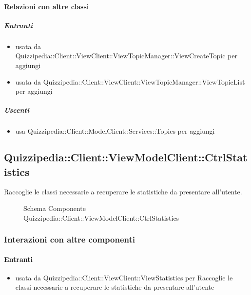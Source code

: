 \paragraph{Relazioni con altre classi}
\subparagraph{Entranti}
\begin{itemize}
\item usata da Quizzipedia::Client::ViewClient::ViewTopicManager::ViewCreateTopic per aggiungi
\item usata da Quizzipedia::Client::ViewClient::ViewTopicManager::ViewTopicList per aggiungi
\end{itemize}
\subparagraph{Uscenti}
\begin{itemize}
\item usa Quizzipedia::Client::ModelClient::Services::Topics per aggiungi
\end{itemize}
\subsection{Quizzipedia::Client::ViewModelClient::CtrlStatistics}
Raccoglie le classi necessarie a recuperare le statistiche da presentare all'utente.
\begin{figure}[H]
\centering
\noindent{}
\caption[Schema Componente Quizzipedia::Client::ViewModelClient::CtrlStatistics]{Schema Componente Quizzipedia::Client::ViewModelClient::CtrlStatistics}
\end{figure}
\subsubsection{Interazioni con altre componenti}
\paragraph{Entranti}
\begin{itemize}
\item usata da Quizzipedia::Client::ViewClient::ViewStatistics per Raccoglie le classi necessarie a recuperare le statistiche da presentare all'utente
\end{itemize}
